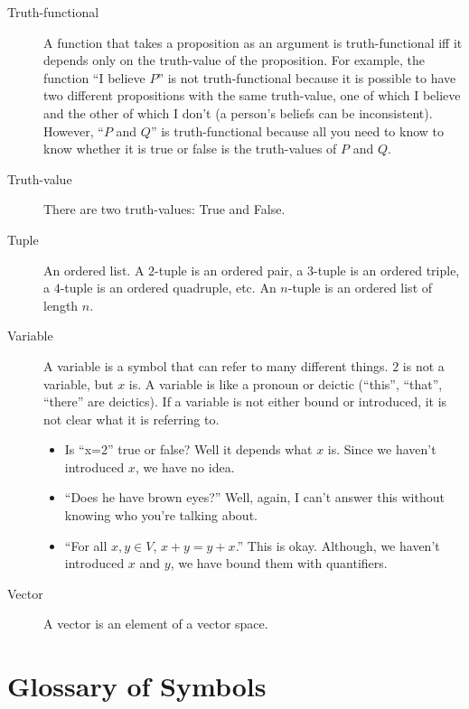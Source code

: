 \documentclass[12pt]{article}
\begin{document}
\begin{description}
  \item[Truth-functional] A function that takes a proposition as an
    argument is truth-functional iff it depends only on the
    truth-value of the proposition.  For example, the function ``I
    believe $P$'' is not truth-functional because it is possible to
    have two different propositions with the same truth-value, one of
    which I believe and the other of which I don't (a person's beliefs
    can be inconsistent).  However, ``$P$ and $Q$'' is
    truth-functional because all you need to know to know whether it
    is true or false is the truth-values of $P$ and $Q$.

  \item[Truth-value] There are two truth-values: True and False.  
    
  \item[Tuple] An ordered list.  A $2$-tuple is an ordered pair, a
    $3$-tuple is an ordered triple, a $4$-tuple is an ordered
    quadruple, etc.  An $n$-tuple is an ordered list of length $n$.

  \item[Variable] A variable is a symbol that can refer to many
    different things. $2$ is not a variable, but $x$ is.  A variable
    is like a pronoun or deictic (``this'', ``that'', ``there'' are
    deictics).  If a variable is not either bound or introduced, it is
    not clear what it is referring to.
    \begin{itemize}
      \item Is ``x=2'' true or false?  Well it depends what $x$ is.
        Since we haven't introduced $x$, we have no idea.
      \item ``Does he have brown eyes?''  Well, again, I can't answer
        this without knowing who you're talking about.
      \item ``For all $x,y\in V$, $x+y=y+x$.''  This is okay.
        Although, we haven't introduced $x$ and $y$, we have bound
        them with quantifiers.
    \end{itemize}
    
  \item[Vector] A vector is an element of a vector space.

\end{description}

\section{Glossary of Symbols}
\end{document}

